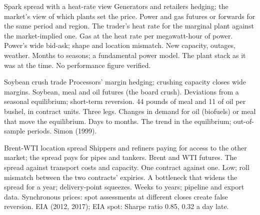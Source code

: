 \begin{strategyfile}{Spark spread with a heat-rate view}\label{strat:s2:commodity-spreads:spark}
 Generators and retailers hedging; the market's view of which plants set the price.
 Power and gas futures or forwards for the same period and region.
 The trader's heat rate for the marginal plant against the market-implied one.
 Gas at the heat rate per megawatt-hour of power.
 Power's wide bid-ask; shape and location mismatch.
 New capacity, outages, weather.
 Months to seasons; a fundamental power model.
 The plant stack as it was at the time.
 No performance figure verified.
\end{strategyfile}

\begin{strategyfile}{Soybean crush trade}\label{strat:s2:commodity-spreads:crush}
 Processors' margin hedging; crushing capacity closes wide margins.
 Soybean, meal and oil futures (the board crush).
 Deviations from a seasonal equilibrium; short-term reversion.
 44 pounds of meal and 11 of oil per bushel, in contract units.
 Three legs.
 Changes in demand for oil (biofuels) or meal that move the equilibrium.
 Days to months.
 The trend in the equilibrium; out-of-sample periods.
 Simon (1999).
\end{strategyfile}

\begin{strategyfile}{Brent-WTI location spread}\label{strat:s2:commodity-spreads:location}
 Shippers and refiners paying for access to the other market; the spread pays for pipes and tankers.
 Brent and WTI futures.
 The spread against transport costs and capacity.
 One contract against one.
 Low; roll mismatch between the two contracts' expiries.
 A bottleneck that widens the spread for a year; delivery-point squeezes.
 Weeks to years; pipeline and export data.
 Synchronous prices: spot assessments at different closes create false reversion.
 EIA (2012, 2017); EIA spot: Sharpe ratio 0.85, 0.32 a day late.
\end{strategyfile}

